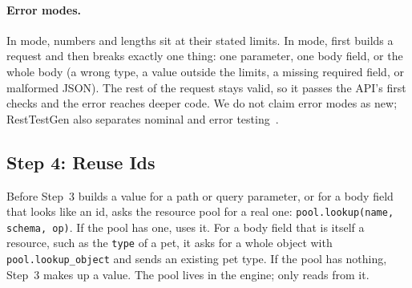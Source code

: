 \paragraph{Error modes.} In  mode, numbers and lengths sit at
their stated limits. In  mode, \tool first builds a
 request and then breaks exactly one thing: one parameter, one
body field, or the whole body (a wrong type, a value outside the limits, a
missing required field, or malformed JSON). The rest of the request stays
valid, so it passes the API's first checks and the error reaches deeper
code. We do not claim error modes as new; RestTestGen also separates nominal
and error testing~\cite{resttestgen-stvr}.

\subsection{Step 4: Reuse Ids}
\label{sec:step4}
Before Step~3 builds a value for a path or query parameter, or for a body
field that looks like an id, \tool asks the resource pool for a real one:
\texttt{pool.lookup(name, schema, op)}. If the pool has one, \tool uses it.
For a body field that is itself a resource, such as the \texttt{type} of a
pet, it asks for a whole object with \texttt{pool.lookup\_object} and sends
an existing pet type. If the pool has nothing, Step~3 makes up a value. The
pool lives in the engine; \tool only reads from it.
